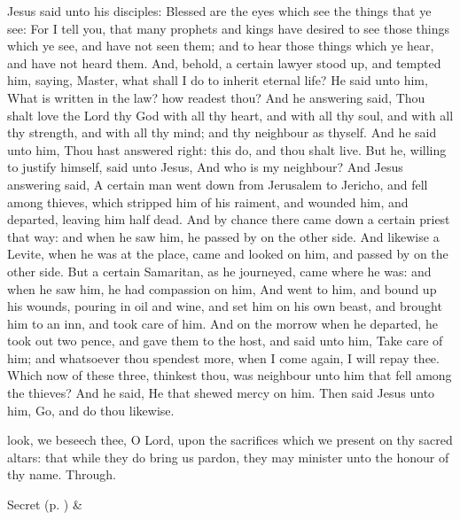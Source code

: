 
 Jesus said unto his disciples: Blessed are the eyes which see the things that ye see: For I tell you, that many prophets and kings have desired to see those things which ye see, and have not seen them; and to hear those things which ye hear, and have not heard them. And, behold, a certain lawyer stood up, and tempted him, saying, Master, what shall I do to inherit eternal life? He said unto him, What is written in the law? how readest thou? And he answering said, Thou shalt love the Lord thy God with all thy heart, and with all thy soul, and with all thy strength, and with all thy mind; and thy neighbour as thyself. And he said unto him, Thou hast answered right: this do, and thou shalt live. But he, willing to justify himself, said unto Jesus, And who is my neighbour? And Jesus answering said, A certain man went down from Jerusalem to Jericho, and fell among thieves, which stripped him of his raiment, and wounded him, and departed, leaving him half dead. And by chance there came down a certain priest that way: and when he saw him, he passed by on the other side. And likewise a Levite, when he was at the place, came and looked on him, and passed by on the other side. But a certain Samaritan, as he journeyed, came where he was: and when he saw him, he had compassion on him, And went to him, and bound up his wounds, pouring in oil and wine, and set him on his own beast, and brought him to an inn, and took care of him. And on the morrow when he departed, he took out two pence, and gave them to the host, and said unto him, Take care of him; and whatsoever thou spendest more, when I come again, I will repay thee. Which now of these three, thinkest thou, was neighbour unto him that fell among the thieves? And he said, He that shewed mercy on him. Then said Jesus unto him, Go, and do thou likewise.


\secret
{} look, we beseech thee, O Lord, upon the sacrifices which we present on thy sacred altars: that while they do bring us pardon, they may minister unto the honour of thy name. Through.
\begin{rubric}
     Secret  (p. \pageref{SPSaints}) \&  
\end{rubric}


